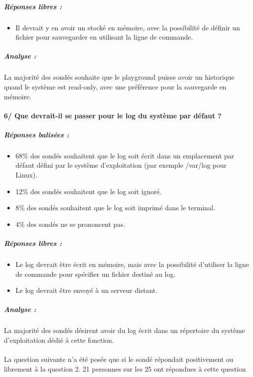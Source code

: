 \subparagraph{Réponses libres :}
\begin{itemize}
	\item Il devrait y en avoir un stocké en mémoire, avec la possibilité de définir un fichier pour sauvegarder en utilisant la ligne de commande.
\end{itemize}

\subparagraph{Analyse :}
La majorité des sondés souhaite que le playground puisse avoir un historique quand le système est read-only, avec une préférence pour la sauvegarde en mémoire.

\paragraph{6/ Que devrait-il se passer pour le log du système par défaut ?}
\subparagraph{Réponses balisées :}
\begin{itemize}
	\item 68\% des sondés souhaitent que le log soit écrit dans un emplacement par défaut défini par le système d'exploitation (par exemple /var/log pour Linux).
	\item 12\% des sondés souhaitent que le log soit ignoré.
	\item 8\% des sondés souhaitent que le log soit imprimé dans le terminal.
	\item 4\% des sondés ne se prononcent pas.
\end{itemize}

\subparagraph{Réponses libres :}
\begin{itemize}
	\item Le log devrait être écrit en mémoire, mais avec la possibilité d'utiliser la ligne de commande pour spécifier un fichier destiné au log.
	\item Le log devrait être envoyé à un serveur distant.
\end{itemize}

\subparagraph{Analyse :}
La majorité des sondés désirent avoir du log écrit dans un répertoire du système d'exploitation dédié à cette fonction.

\paragraph{}
La question suivante n'a été posée que si le sondé répondait positivement ou librement à la question 2. 21 personnes sur les 25 ont répondues à cette question

